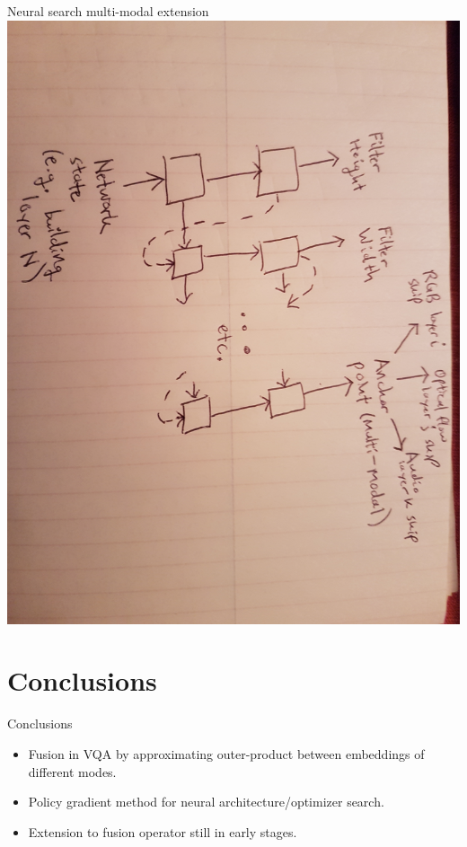 \documentclass{beamer}
\begin{document}
{%
%
%
\begin{frame}{Neural search multi-modal extension}
        \center{}
        \includegraphics[scale=0.075]{data/multi_modal_neural}
\end{frame}
}


\section{Conclusions}

\begin{frame}[fragile]{Conclusions}
        \begin{itemize}[<+- | alert@+>]
                \item Fusion in VQA by approximating outer-product between
                        embeddings of different modes.

                \item Policy gradient method for neural architecture/optimizer
                        search.

                \item Extension to fusion operator still in early stages.
        \end{itemize}
\end{frame}
\end{document}
